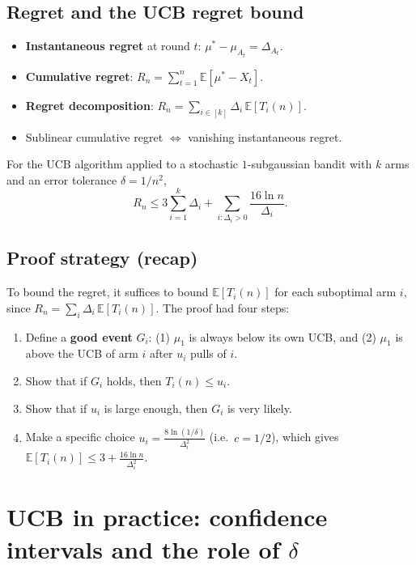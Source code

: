 \subsection{Regret and the UCB regret bound}

\begin{itemize}
    \item \textbf{Instantaneous regret} at round $t$: $\mu^* - \mu_{A_t} = \Delta_{A_t}$.
    \item \textbf{Cumulative regret}: $R_n = \sum_{t=1}^n \mathbb{E}[\mu^* - X_t]$.
    \item \textbf{Regret decomposition}: $R_n = \sum_{i \in [k]} \Delta_i\, \mathbb{E}[T_i(n)]$.
    \item Sublinear cumulative regret $\Leftrightarrow$ vanishing instantaneous regret.
\end{itemize}

\begin{theorem}
For the UCB algorithm applied to a stochastic $1$-subgaussian bandit with $k$ arms and an error tolerance $\delta = 1/n^2$,
\[
R_n \leq 3\sum_{i=1}^k \Delta_i + \sum_{i : \Delta_i > 0} \frac{16\ln n}{\Delta_i}.
\]
\end{theorem}

\subsection{Proof strategy (recap)}

To bound the regret, it suffices to bound $\mathbb{E}[T_i(n)]$ for each suboptimal arm $i$, since $R_n = \sum_i \Delta_i\,\mathbb{E}[T_i(n)]$. The proof had four steps:
\begin{enumerate}
    \item Define a \textbf{good event} $G_i$: (1) $\mu_1$ is always below its own UCB, and (2) $\mu_1$ is above the UCB of arm $i$ after $u_i$ pulls of $i$.
    \item Show that if $G_i$ holds, then $T_i(n) \leq u_i$.
    \item Show that if $u_i$ is large enough, then $G_i$ is very likely.
    \item Make a specific choice $u_i = \frac{8\ln(1/\delta)}{\Delta_i^2}$ (i.e.\ $c = 1/2$), which gives $\mathbb{E}[T_i(n)] \leq 3 + \frac{16\ln n}{\Delta_i^2}$.
\end{enumerate}

\section{UCB in practice: confidence intervals and the role of $\delta$}

